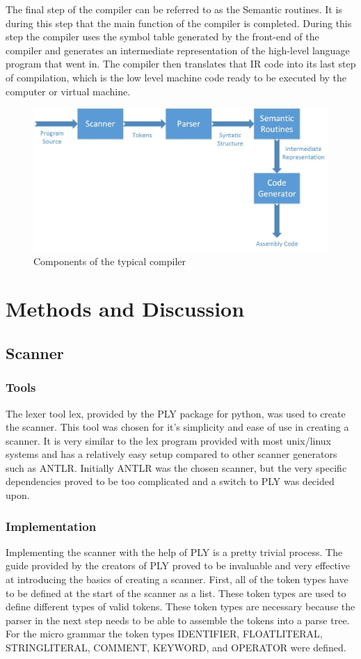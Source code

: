 \documentclass[12pt, oneside]{article}   	%
\begin{document}
The final step of the compiler can be referred to as the Semantic
routines. It is during this step that the main function of the compiler is completed.
During this step the compiler uses the symbol table generated by the front-end of
the compiler and generates an intermediate representation of the high-level
language program that went in. The compiler then translates that IR code into its
last step of compilation, which is the low level machine code ready to be
executed by the computer or virtual machine.

\begin{figure}[h!]
	\centerline{\includegraphics[width=.4\linewidth]{pics/diagram}}
	\caption{Components of the typical compiler}
\end{figure}


\section{Methods and Discussion}
\subsection{Scanner}
\subsubsection{Tools}
The lexer tool lex, provided by the PLY package for python, was used to create the scanner. This tool was chosen for it's simplicity and ease of use in creating a scanner. It is very similar to the lex program provided with most unix/linux systems and has a relatively easy setup compared to other scanner generators such as ANTLR. 
Initially ANTLR was the chosen scanner, but the very specific dependencies proved to be too complicated and a switch to PLY was decided upon. 

\subsubsection{Implementation}
Implementing the scanner with the help of PLY is a pretty trivial process. The guide
provided by the creators of PLY proved to be invaluable and very effective at
introducing the basics of creating a scanner.\cite{PLY} First, all of the token types have to be defined at the start of the scanner as a
list. These token types are used to define different types of valid tokens. These token types are necessary because the parser in the next step needs to be able to assemble the tokens into a parse tree. For the micro  grammar the token types IDENTIFIER, FLOATLITERAL, STRINGLITERAL, COMMENT, KEYWORD, and OPERATOR were defined.
\end{document}
